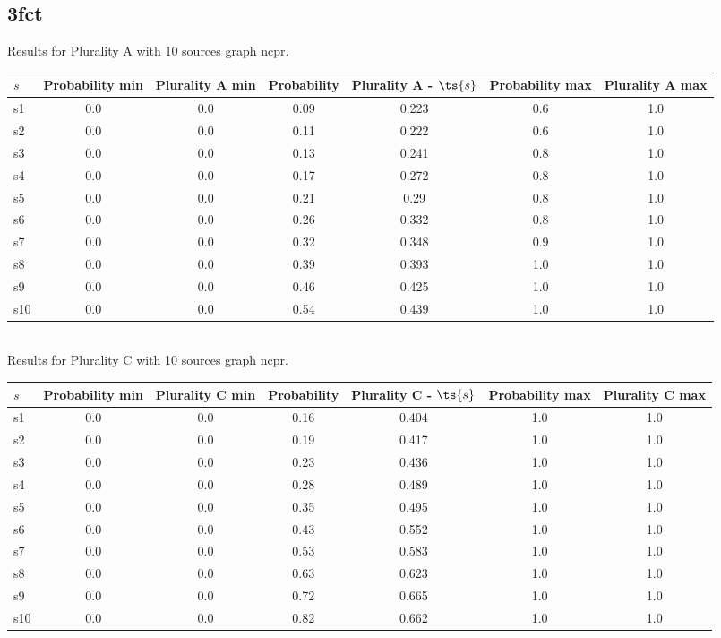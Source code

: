 \documentclass{article}
\begin{document}
\newpage

\subsection{3fct}

\noindent Results for Plurality A with 10 sources graph ncpr.

\noindent\begin{tabular}{|l|c|c|c|c|c|c|}
\hline
$s$& Probability min & Plurality A min & Probability & Plurality A - $\ts{s}$ & Probability max & Plurality A max\\
\hline
s1 &0.0 & 0.0 & 0.09 & 0.223 & 0.6 & 1.0\\
\hline
s2 &0.0 & 0.0 & 0.11 & 0.222 & 0.6 & 1.0\\
\hline
s3 &0.0 & 0.0 & 0.13 & 0.241 & 0.8 & 1.0\\
\hline
s4 &0.0 & 0.0 & 0.17 & 0.272 & 0.8 & 1.0\\
\hline
s5 &0.0 & 0.0 & 0.21 & 0.29 & 0.8 & 1.0\\
\hline
s6 &0.0 & 0.0 & 0.26 & 0.332 & 0.8 & 1.0\\
\hline
s7 &0.0 & 0.0 & 0.32 & 0.348 & 0.9 & 1.0\\
\hline
s8 &0.0 & 0.0 & 0.39 & 0.393 & 1.0 & 1.0\\
\hline
s9 &0.0 & 0.0 & 0.46 & 0.425 & 1.0 & 1.0\\
\hline
s10 &0.0 & 0.0 & 0.54 & 0.439 & 1.0 & 1.0\\
\hline
\end{tabular}\\

\noindent Results for Plurality C with 10 sources graph ncpr.

\noindent\begin{tabular}{|l|c|c|c|c|c|c|}
\hline
$s$& Probability min & Plurality C min & Probability & Plurality C - $\ts{s}$ & Probability max & Plurality C max\\
\hline
s1 &0.0 & 0.0 & 0.16 & 0.404 & 1.0 & 1.0\\
\hline
s2 &0.0 & 0.0 & 0.19 & 0.417 & 1.0 & 1.0\\
\hline
s3 &0.0 & 0.0 & 0.23 & 0.436 & 1.0 & 1.0\\
\hline
s4 &0.0 & 0.0 & 0.28 & 0.489 & 1.0 & 1.0\\
\hline
s5 &0.0 & 0.0 & 0.35 & 0.495 & 1.0 & 1.0\\
\hline
s6 &0.0 & 0.0 & 0.43 & 0.552 & 1.0 & 1.0\\
\hline
s7 &0.0 & 0.0 & 0.53 & 0.583 & 1.0 & 1.0\\
\hline
s8 &0.0 & 0.0 & 0.63 & 0.623 & 1.0 & 1.0\\
\hline
s9 &0.0 & 0.0 & 0.72 & 0.665 & 1.0 & 1.0\\
\hline
s10 &0.0 & 0.0 & 0.82 & 0.662 & 1.0 & 1.0\\
\hline
\end{tabular}\\
\end{document}
